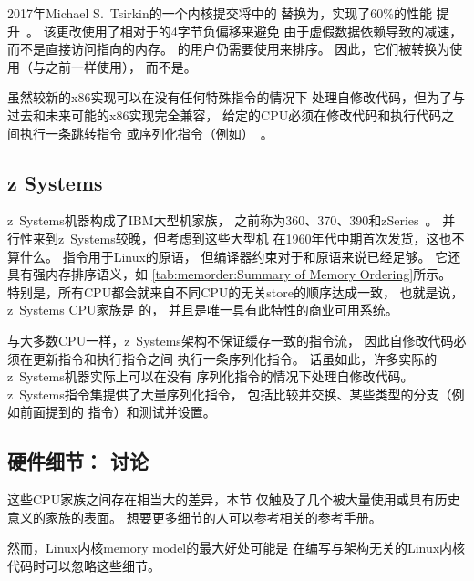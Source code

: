2017年Michael S.~Tsirkin的一个内核提交将中的
替换为，实现了60\%的性能
提升~\cite{Tsirkin2017}。
该更改使用了相对于的4字节负偏移来避免
由于虚假数据依赖导致的减速，而不是直接访问指向的内存。
的用户仍需要使用来排序。
因此，它们被转换为使用（与之前一样使用），
而不是。

虽然较新的x86实现可以在没有任何特殊指令的情况下
处理自修改代码，但为了与过去和未来可能的x86实现完全兼容，
给定的CPU必须在修改代码和执行代码之间执行一条跳转指令
或序列化指令（例如）~\cite[Section 8.1.3]{Intel64IA32v3A2011}。

\subsection{z Systems}

z~Systems机器构成了IBM大型机家族，
之前称为360、370、390和zSeries~\cite{IBMzSeries04a}。
并行性来到z~Systems较晚，但考虑到这些大型机
在1960年代中期首次发货，这也不算什么。
指令用于Linux的原语，
但编译器约束对于和原语来说已经足够。
它还具有强内存排序语义，如
\cref{tab:memorder:Summary of Memory Ordering}所示。
特别是，所有CPU都会就来自不同CPU的无关store的顺序达成一致，
也就是说，z~Systems CPU家族是
的，
并且是唯一具有此特性的商业可用系统。

与大多数CPU一样，z~Systems架构不保证缓存一致的指令流，
因此自修改代码必须在更新指令和执行指令之间
执行一条序列化指令。
话虽如此，许多实际的z~Systems机器实际上可以在没有
序列化指令的情况下处理自修改代码。
z~Systems指令集提供了大量序列化指令，
包括比较并交换、某些类型的分支（例如前面提到的
指令）和测试并设置。

\subsection{硬件细节：
	    讨论}
\label{sec:memorder:Hardware Specifics: Discussion}

这些CPU家族之间存在相当大的差异，本节
仅触及了几个被大量使用或具有历史意义的家族的表面。
想要更多细节的人可以参考相关的参考手册。

然而，Linux内核memory model的最大好处可能是
在编写与架构无关的Linux内核代码时可以忽略这些细节。

